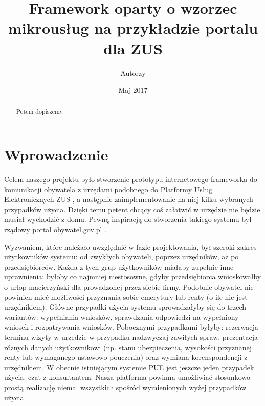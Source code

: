 \documentclass[licencjacka]{pracamgr}
\author{Autorzy}
\title{Framework oparty o wzorzec mikrousług na przykładzie portalu dla ZUS}
\date{Maj 2017}
\begin{document}
\maketitle

\begin{abstract}
  Potem dopiszemy.
\end{abstract}

\tableofcontents



\chapter*{Wprowadzenie}\label{r:wstep}

Celem naszego projektu było stworzenie prototypu internetowego frameworka do komunikacji obywatela z urzędami
podobnego do Platformy Usług Elektronicznych ZUS \cite{zuspue}, a następnie zaimplementowanie na niej kilku wybranych przypadków użycia. Dzięki temu petent chcący
coś załatwić w urzędzie nie będzie musiał wychodzić z domu. Pewną inspiracją do stworzenia takiego systemu był
rządowy portal obywatel.gov.pl \cite{mcobywatel}.

Wyzwaniem, które należało uwzględnić w fazie projektowania, był szeroki zakres użytkowników systemu: od zwykłych
obywateli, poprzez urzędników, aż po przedsiębiorców. Każda z tych grup użytkowników miałaby zupełnie inne uprawnienia:
byłoby co najmniej niestosowne, gdyby przedsiębiorca wnioskowałby o urlop macierzyński dla prowadzonej przez siebie
firmy. Podobnie obywatel nie powinien mieć możliwości przyznania sobie emerytury lub renty (o ile nie jest urzędnikiem). Główne przypadki użycia systemu sprowadzałyby się do trzech wariantów: wypełniania wniosków, sprawdzania
odpowiedzi na wypełniony wniosek i rozpatrywania wniosków. Pobocznymi przypadkami byłyby: rezerwacja terminu wizyty w
urzędzie w przypadku nadzwyczaj zawiłych spraw, prezentacja różnych danych użytkownikowi (np. stanu ubezpieczenia,
wysokości przyznanej renty lub wymaganego ustawowo pouczenia) oraz wymiana korenspondencji z urzędnikiem. W obecnie
istniejącym systemie PUE jest jeszcze jeden przypadek użycia: czat z konsultantem. Nasza platforma powinna umożliwiać
stosunkowo prostą realizację niemal wszystkich spośród wymienionych wyżej przypadków użycia.
\end{document}
